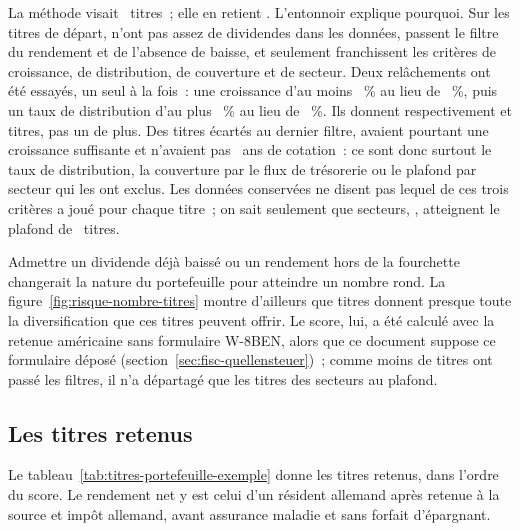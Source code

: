 La m\'ethode visait \NombreTitresVise~titres~; elle en retient \NombreTitres. L'entonnoir explique
pourquoi. Sur les \UniversTitres{} titres de d\'epart, \UniversSansHistorique{} n'ont pas assez de
dividendes dans les donn\'ees, \UniversFiltreRendement{} passent le filtre du rendement et de
l'absence de baisse, et \NombreTitres{} seulement franchissent les crit\`eres de croissance, de
distribution, de couverture et de secteur. Deux rel\^achements ont \'et\'e essay\'es, un seul \`a la
fois~: une croissance d'au moins \RegleCroissanceRelache~\% au lieu de \RegleCroissanceMin~\%, puis
un taux de distribution d'au plus \ReglePayoutRelache~\% au lieu de \ReglePayoutMax~\%. Ils donnent
respectivement \PalierCroissanceTitres{} et \PalierPayoutTitres{} titres, pas un de plus. Des
\TitresEcartesFin{} titres \'ecart\'es au dernier filtre, \TitresEcartesCroissanceOk{} avaient pourtant
une croissance suffisante et \TitresEcartesSansRecul{} n'avaient pas \RegleAnneesCroissance~ans de
cotation~: ce sont donc surtout le taux de distribution, la couverture par le flux de tr\'esorerie ou
le plafond par secteur qui les ont exclus. Les donn\'ees conserv\'ees ne disent pas lequel de ces
trois crit\`eres a jou\'e pour chaque titre~; on sait seulement que \SecteursAuPlafond{} secteurs,
\SecteursAuPlafondNoms, atteignent le plafond de \RegleSecteurMax~titres.

 Admettre un dividende d\'ej\`a baiss\'e ou un
rendement hors de la fourchette changerait la nature du portefeuille pour atteindre un nombre rond.
La figure~\ref{fig:risque-nombre-titres} montre d'ailleurs que \NombreTitres{} titres donnent
presque toute la diversification que ces titres peuvent offrir. Le score, lui, a \'et\'e calcul\'e
avec la retenue am\'ericaine sans formulaire W-8BEN, alors que ce document suppose ce formulaire
d\'epos\'e (section~\ref{sec:fisc-quellensteuer})~; comme moins de \NombreTitresVise{} titres ont pass\'e
les filtres, il n'a d\'epartag\'e que les titres des secteurs au plafond.

\subsection{Les titres retenus}\label{sec:porte-titres}

Le tableau~\ref{tab:titres-portefeuille-exemple} donne les \NombreTitres{} titres retenus, dans
l'ordre du score. Le rendement net y est celui d'un r\'esident allemand apr\`es retenue \`a la source
et imp\^ot allemand, avant assurance maladie et sans forfait d'\'epargnant.

